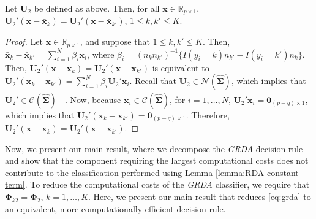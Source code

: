 \documentclass[11pt]{article}
\newcommand{\xbar}{\bar{\bm x}}
\begin{document}
\begin{lemma}\label{lemma:RDA-constant-term}
Let $\bm U_2$ be defined as above. Then, for all $\bm x \in \mathbb{R}_{p \times 1}$, $\bm U_2' (\bm x - \xbar_k) = \bm U_2' (\bm x - \xbar_{k'})$, $1 \le k, k' \le K$.
\end{lemma}
\begin{proof}
Let $\bm x \in \mathbb{R}_{p \times 1}$, and suppose that $1 \le k, k' \le K$. Then, $\xbar_k - \xbar_{k'} = \sum_{i=1}^N \beta_i \bm x_i$, where $\beta_i = (n_k n_{k'})^{-1} \{ I(y_i = k) n_{k'} - I(y_i = k') n_k \}$.  Then, $\bm U_2' (\bm x - \xbar_k) = \bm U_2' (\bm x - \xbar_{k'})$ is equivalent to $\bm U_2'(\xbar_k - \xbar_{k'}) = \sum_{i=1}^N \beta_i \bm U_2' \bm x_i$. Recall that $\bm U_2 \in \mathcal{N}(\widehat{\bm \Sigma})$, which implies that $\bm U_2' \in \mathcal{C}(\widehat{\bm \Sigma})^{\perp}$ \citep[Lemma 1.2.5]{Kollo:2005vp}. Now, because $\bm x_i \in \mathcal{C}(\widehat{\bm \Sigma})$, for $i = 1, \ldots, N$, $\bm U_2' \bm x_i = \bm 0_{(p-q) \times 1}$, which implies that $\bm U_2'(\xbar_k - \xbar_{k'}) = \bm 0_{(p-q) \times 1}$. Therefore, $\bm U_2' (\bm x - \xbar_k) = \bm U_2' (\bm x - \xbar_{k'})$.
\end{proof}

Now, we present our main result, where we decompose the \emph{GRDA} decision rule and show that the component requiring the largest computational costs does not contribute to the classification performed using Lemma \ref{lemma:RDA-constant-term}. To reduce the computational costs of the \emph{GRDA} classifier, we require that $\bm \Phi_{k2} = \bm \Phi_2$, $k = 1, \ldots, K$.
Here, we present our main result that reduces \eqref{eq:grda} to an equivalent, more computationally efficient decision rule.
\end{document}
